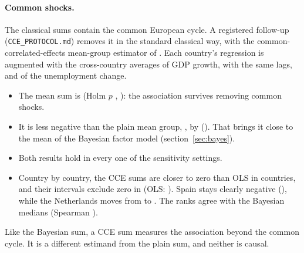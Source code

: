 \paragraph{Common shocks.} The classical sums contain the common European cycle. A
registered follow-up (\texttt{CCE\_PROTOCOL.md}) removes it in the standard classical way,
with the common-correlated-effects mean-group estimator of \citet{pesaran2006cce}. Each
country's regression is augmented with the cross-country averages of GDP growth, with the
same lags, and of the unemployment change.
\begin{itemize}
  \item The mean sum is   (Holm $p$ ,
    ): the association survives removing common shocks.
  \item It is less negative than the plain mean group, , by 
     (). That brings it close to the mean of the
    Bayesian factor model (section~\ref{sec:bayes}).
  \item Both results hold in every one of the  sensitivity settings.
  \item Country by country, the CCE sums are closer to zero than OLS in 
    countries, and their intervals exclude zero in  (OLS:
    ). Spain stays clearly negative (), while the
    Netherlands moves from  to . The ranks agree with the
    Bayesian medians (Spearman ).
\end{itemize}
Like the Bayesian sum, a CCE sum measures the association beyond the common cycle. It is a
different estimand from the plain sum, and neither is causal.

